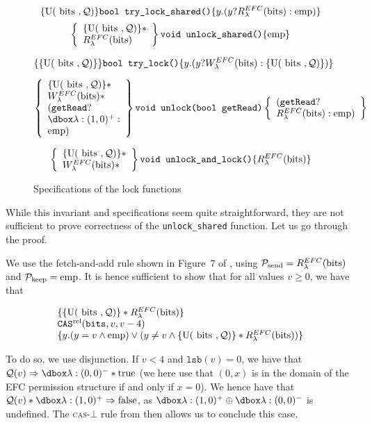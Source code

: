 \begin{figure}
		$$\{\text{U}(\text { bits }, \mathcal{Q})\} \texttt{bool try\_lock\_shared()}\{y. (y ? R_{\lambda}^{EFC}(\text{bits}) : \mathrm{emp})\}$$
\[
\left\{\begin{array}{l}\{\text{U}(\text { bits }, \mathcal{Q})\}* \\ {R_{\lambda}^{EFC}(\text{bits})}\end{array}\right\}
\texttt{void unlock\_shared()} \{\mathrm{emp}\} \]


$$\{\{\text{U}(\text { bits }, \mathcal{Q})\}\}\texttt{bool try\_lock()} \{y. (y ? W_{\lambda}^{EFC}(\text{bits}) : \{\text{U}(\text { bits }, \mathcal{Q})\})\}$$


\[
\left\{\begin{array}{l}\Uperm* \\ \wPerm* \\ (\texttt{getRead} ? \\ \ghost{\lambda: (1, 0)^+} : \\ \emp) \end{array}\right\}
\texttt{void unlock(bool getRead)}
\left\{\begin{array}{l}(\texttt{getRead} ? \\ \rPerm : \emp) \end{array}\right\} \]

\[
\left\{\begin{array}{l}\{\text{U}(\text { bits }, \mathcal{Q})\}* \\ W_{\lambda}^{EFC}(\text{bits})* \end{array}\right\}
\texttt{void unlock\_and\_lock()}
\{R_{\lambda}^{EFC}(\text{bits})\} \]
\caption{Specifications of the lock functions}
\label{fig:specRWFolly}
\end{figure}

While this invariant and specifications seem quite straightforward, they are not sufficient to prove correctness of the \texttt{unlock\_shared} function. Let us go through the proof.

We use the fetch-and-add rule shown in Figure~7 of \cite{fsl}, using $\mathcal{P}_{\text{send}} = R_{\lambda}^{EFC}(\text{bits})$ and $\mathcal{P}_{\text{keep}} = \mathrm{emp}$. It is hence sufficient to show that for all values  $v \geq 0$, we have that 

\[
\begin{array}{l}
\{\{\text{U}(\text { bits }, \mathcal{Q})\} * R_{\lambda}^{EFC}(\text{bits})\} \\
\texttt{CAS}^{\text{rel}}(\texttt{bits}, v, v - 4) \\
\{y. (y = v \land \mathrm{emp}) \lor (y \neq v \land \{\text{U}(\text { bits }, \mathcal{Q})\} * R_{\lambda}^{EFC}(\text{bits}))\}
\end{array}\]

To do so, we use disjunction.
If $v < 4$ and $\texttt{lsb}(v) = 0$, we have that $\mathcal{Q}(v) \Rightarrow \efcm{0}{0} * \text{true}$ (we here use that $(0, x)$ is in the domain of the EFC permission structure if and only if $x = 0$). We hence have that $\mathcal{Q}(v) * \efcp{1}{0} \Rightarrow \text{false}$, as $\efcp{1}{0} \oplus \efcm{0}{0}$ is undefined. The \textsc{cas}-$\bot$ rule from \cite{fsl} then allows us to conclude this case.

